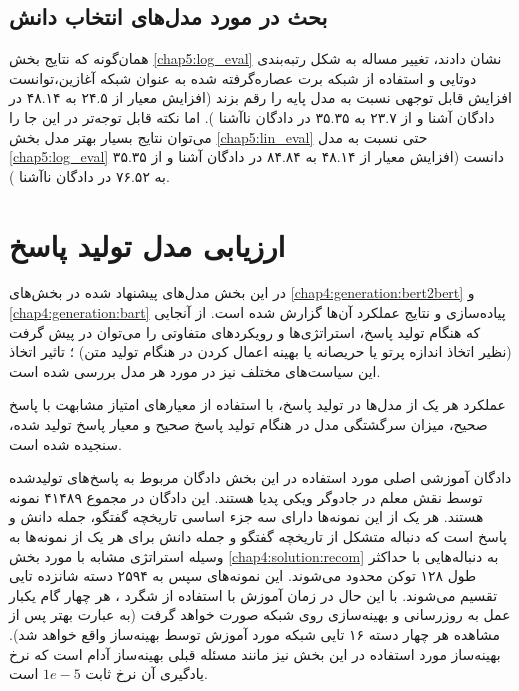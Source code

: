 \subsection{بحث در مورد مدل‌های انتخاب دانش}

همان‌گونه که نتایج بخش 
\ref{chap5:log_eval}
نشان دادند، تغییر مساله به شکل رتبه‌بندی دوتایی و استفاده از شبکه برت عصاره‌گرفته شده به عنوان شبکه آغازین،‌توانست افزایش قابل توجهی نسبت به مدل پایه را رقم بزند (افزایش معیار
از ۲۴.۵ به ۴۸.۱۴ در دادگان آشنا و از ۲۳.۷ به ۳۵.۳۵ در دادگان ناآشنا
).
اما نکته قابل توجه‌تر در این جا را می‌توان نتایج بسیار بهتر مدل بخش
\ref{chap5:lin_eval}
حتی نسبت به مدل 
\ref{chap5:log_eval}
دانست (افزایش معیار
از ۴۸.۱۴ به ۸۴.۸۴ در دادگان آشنا و از ۳۵.۳۵ به ۷۶.۵۲ در دادگان ناآشنا
).

\section{ارزیابی مدل تولید پاسخ}

در این بخش مدل‌های پیشنهاد شده در بخش‌های 
\ref{chap4:generation:bert2bert}
و
\ref{chap4:generation:bart}
پیاده‌سازی و نتایج عملکرد آن‌ها گزارش شده است. از آنجایی که هنگام تولید پاسخ، استراتژی‌ها و رویکرد‌های متفاوتی را می‌توان در پیش گرفت (نظیر اتخاذ اندازه پرتو یا حریصانه یا بهینه اعمال کردن در هنگام تولید متن) ؛ تاثیر اتخاذ این سیاست‌های مختلف نیز در مورد هر مدل بررسی شده است.

عملکرد هر یک از مدل‌ها در تولید پاسخ، با استفاده از معیار‌های امتیاز مشابهت
با پاسخ صحیح، میزان سرگشتگی مدل در هنگام تولید پاسخ صحیح و معیار
پاسخ تولید شده، سنجیده شده است.

دادگان آموزشی اصلی مورد استفاده در این بخش دادگان  مربوط به پاسخ‌های تولیدشده توسط نقش معلم در جادوگر ویکی پدیا هستند. این دادگان در مجموع ۴۱۴۸۹ نمونه هستند. هر یک از این نمونه‌ها دارای سه جزء اساسی تاریخچه گفتگو، جمله دانش و پاسخ است که دنباله متشکل از تاریخچه گفتگو و جمله دانش برای هر یک از نمونه‌ها به وسیله استراتژی مشابه با مورد بخش
\ref{chap4:solution:recom}
به دنباله‌هایی با حداکثر طول ۱۲۸ توکن محدود می‌شوند. این نمونه‌های سپس به ۲۵۹۴ دسته شانزده تایی تقسیم می‌شوند. با این حال در زمان آموزش با استفاده از شگرد 
، هر چهار گام یکبار عمل به روزرسانی و بهینه‌سازی روی شبکه صورت خواهد گرفت (به عبارت بهتر پس از مشاهده هر چهار دسته ۱۶ تایی شبکه مورد آموزش توسط بهینه‌ساز واقع خواهد شد). بهینه‌ساز مورد استفاده در این بخش نیز مانند مسئله قبلی بهینه‌ساز آدام است که نرخ یادگیری آن نرخ ثابت 
$1e-5$
است. 

